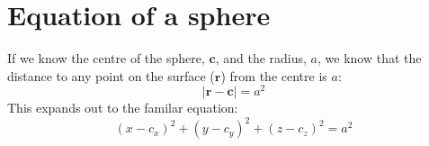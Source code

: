 \section{Equation of a sphere}
If we know the centre of the sphere, $\bm{c}$, and the radius, $a$, we know that
the distance to any point on the surface ($\bm{r}$) from the centre is $a$:
$$
	|\bm{r} - \bm{c}| = a^2
$$
This expands out to the familar equation:
$$
	{(x-c_x)}^2 + {(y-c_y)}^2 + {(z-c_z)}^2 = a^2
$$

